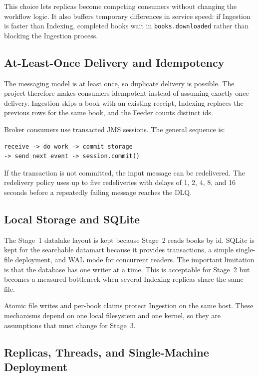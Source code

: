 \documentclass[12pt,a4paper]{article}
\begin{document}
This choice lets replicas become competing consumers without changing the workflow logic. It also
buffers temporary differences in service speed: if Ingestion is faster than Indexing, completed
books wait in \texttt{books.downloaded} rather than blocking the Ingestion process.

\subsection{At-Least-Once Delivery and Idempotency}

The messaging model is at least once, so duplicate delivery is possible. The project therefore
makes consumers idempotent instead of assuming exactly-once delivery. Ingestion skips a book with
an existing receipt, Indexing replaces the previous rows for the same book, and the Feeder counts
distinct ids.

Broker consumers use transacted JMS sessions. The general sequence is:
\begin{verbatim}
receive -> do work -> commit storage
-> send next event -> session.commit()
\end{verbatim}
If the transaction is not committed, the input message can be redelivered. The redelivery policy
uses up to five redeliveries with delays of 1, 2, 4, 8, and 16 seconds before a repeatedly failing
message reaches the DLQ.

\subsection{Local Storage and SQLite}

The Stage~1 datalake layout is kept because Stage~2 reads books by id. SQLite is kept for the
searchable datamart because it provides transactions, a simple single-file deployment, and WAL
mode for concurrent readers. The important limitation is that the database has one writer at a
time. This is acceptable for Stage~2 but becomes a measured bottleneck when several Indexing
replicas share the same file.

Atomic file writes and per-book claims protect Ingestion on the same host. These mechanisms depend
on one local filesystem and one kernel, so they are assumptions that must change for Stage~3.

\subsection{Replicas, Threads, and Single-Machine Deployment}
\end{document}
